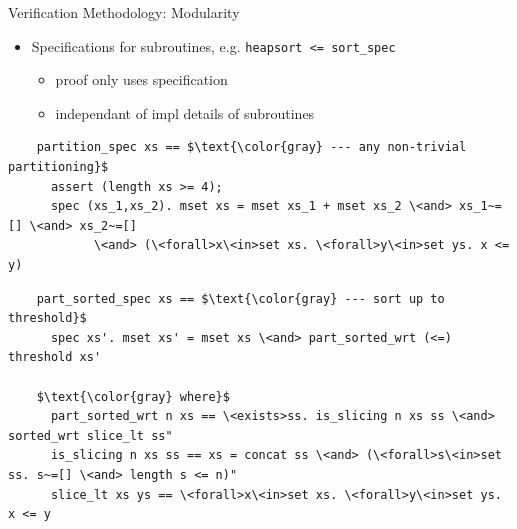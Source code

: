 \documentclass[fleqn]{beamer}
\newcommand{\isai}{\lstinline[language=isabelle,basicstyle=\normalsize\ttfamily\slshape]}
\begin{document}
\begin{frame}[fragile]{Verification Methodology: Modularity}
  \begin{itemize}
   \item Specifications for subroutines, e.g. \isai{heapsort <= sort_spec}
    \begin{itemize}
     \item proof only uses specification
     \item independant of impl details of subroutines

    \end{itemize}
  \end{itemize}
  \pause
  \begin{lstlisting}
    partition_spec xs == $\text{\color{gray} --- any non-trivial partitioning}$
      assert (length xs >= 4);
      spec (xs_1,xs_2). mset xs = mset xs_1 + mset xs_2 \<and> xs_1~=[] \<and> xs_2~=[]
            \<and> (\<forall>x\<in>set xs. \<forall>y\<in>set ys. x <= y)

  \end{lstlisting}
  \pause
  \begin{lstlisting}
    part_sorted_spec xs == $\text{\color{gray} --- sort up to threshold}$
      spec xs'. mset xs' = mset xs \<and> part_sorted_wrt (<=) threshold xs'

    $\text{\color{gray} where}$
      part_sorted_wrt n xs == \<exists>ss. is_slicing n xs ss \<and> sorted_wrt slice_lt ss"
      is_slicing n xs ss == xs = concat ss \<and> (\<forall>s\<in>set ss. s~=[] \<and> length s <= n)"
      slice_lt xs ys == \<forall>x\<in>set xs. \<forall>y\<in>set ys. x <= y

  \end{lstlisting}

\end{frame}
\end{document}
